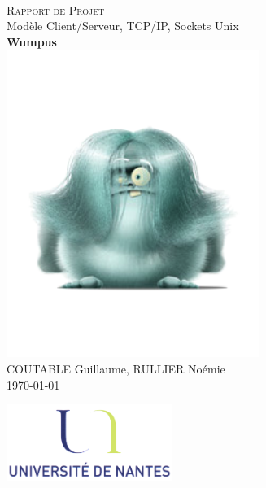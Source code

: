 \documentclass[a4paper,10pt]{article}
\begin{document}
	\fancyhead[L,C,R,LO,CO,RO]{}
	\fancyfoot[L,C,R,LO,CO,RO]{}
	\renewcommand{\headrulewidth}{0.4pt}
	\renewcommand{\footrulewidth}{0.4pt}

	\begin{titlepage}

	\vspace*{\fill}~
	\begin{center}
	{\large \textsc{Rapport de Projet}} \\
	\vspace{1cm}
	{\LARGE Modèle Client/Serveur, TCP/IP, Sockets Unix} \\
	\vspace{1cm}
	\textbf{Wumpus} \\
	\includegraphics[height=10cm]{Images/Wumpus.png} \\
	\vspace{1cm}
	COUTABLE Guillaume, RULLIER Noémie \\
	\today
	\end{center}
	\vspace*{\fill}

	\begin{center}
	\noindent
	\includegraphics[height=2.5cm]{Images/universite.png}
	\end{center}
	\pagebreak
	\end{titlepage}
\end{document}
